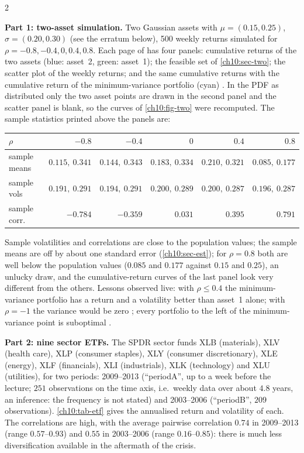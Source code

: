 \begin{paracol}{2}
\begin{casestudy}
\textbf{Part 1: two-asset simulation.} Two Gaussian assets with $\mu=(0.15,0.25)$, $\sigma=(0.20,0.30)$ (see the erratum
below), 500 weekly returns simulated for $\rho=-0.8,-0.4,0,0.4,0.8$. Each page of  has four
panels: cumulative returns of the two assets (blue: asset~2, green: asset~1); the feasible set of
\cref{ch10:sec-two}; the scatter plot of the weekly returns; and the same cumulative returns with the cumulative return
of the minimum-variance portfolio (cyan) . In the PDF as distributed only the two asset
points are drawn in the second panel and the scatter panel is blank, so the curves of \cref{ch10:fig-two} were recomputed.
The sample statistics printed above the panels are:
\begin{center}
\small
\begin{tabular}{@{}lrrrrr@{}}
\toprule
$\rho$ & $-0.8$ & $-0.4$ & $0$ & $0.4$ & $0.8$\\
\midrule
sample means & $0.115,\ 0.341$ & $0.144,\ 0.343$ & $0.183,\ 0.334$ & $0.210,\ 0.321$ & $0.085,\ 0.177$\\
sample vols & $0.191,\ 0.291$ & $0.194,\ 0.291$ & $0.200,\ 0.289$ & $0.200,\ 0.287$ & $0.196,\ 0.287$\\
sample corr.\ & $-0.784$ & $-0.359$ & $0.031$ & $0.395$ & $0.791$\\
\bottomrule
\end{tabular}
\end{center}
Sample volatilities and correlations are close to the population values; the sample means are off by about one
standard error (\cref{ch10:sec-est}); for $\rho=0.8$ both are well below the population values ($0.085$ and $0.177$ against $0.15$ and $0.25$), an unlucky
draw, and the cumulative-return curves of the last panel look very different from the others. Lessons observed live: with
$\rho\le0.4$ the minimum-variance portfolio has a return and a volatility better than asset~1 alone; with
$\rho=-1$ the variance would be zero ; every portfolio to the left of the minimum-variance point is
suboptimal .

\textbf{Part 2: nine sector ETFs.} The SPDR sector funds XLB (materials), XLV (health care), XLP (consumer staples),
XLY (consumer discretionary), XLE (energy), XLF (financials), XLI (industrials), XLK (technology) and XLU (utilities), for two
periods: 2009--2013 (``periodA'', up to a week before the lecture; $251$ observations on the time axis, i.e.\ weekly
data over about $4.8$ years, an inference: the frequency is not stated) and 2003--2006 (``periodB'', $209$ observations).
\cref{ch10:tab-etf} gives the annualised return and volatility of each. The correlations are high, with the
average pairwise correlation $0.74$ in 2009--2013 (range $0.57$--$0.93$) and $0.55$ in 2003--2006 (range
$0.16$--$0.85$): there is much less diversification available in the aftermath of the crisis.


\end{casestudy}
\end{paracol}
